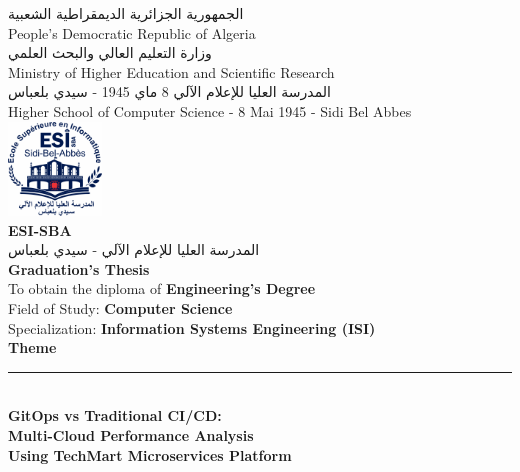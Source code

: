 \thispagestyle{empty}

\begin{center}

{\footnotesize \textarabic{الجمهورية الجزائرية الديمقراطية الشعبية}} \\[0.05cm]
{\footnotesize People's Democratic Republic of Algeria} \\[0.1cm]

{\footnotesize \textarabic{وزارة التعليم العالي والبحث العلمي}} \\[0.05cm]
{\footnotesize Ministry of Higher Education and Scientific Research} \\[0.1cm]

{\footnotesize \textarabic{المدرسة العليا للإعلام الآلي 8 ماي 1945 - سيدي بلعباس}} \\[0.05cm]
{\footnotesize Higher School of Computer Science - 8 Mai 1945 - Sidi Bel Abbes} \\[0.2cm]

\includegraphics[width=2.5cm]{figures/logos/esi-sba-logo.png} \\[0.15cm]

{\small \textbf{ESI-SBA}} \\[0.05cm]
{\footnotesize \textarabic{المدرسة العليا للإعلام الآلي - سيدي بلعباس}} \\[0.3cm]

{\large \textbf{Graduation's Thesis}} \\[0.2cm]

{\footnotesize To obtain the diploma of \textbf{Engineering's Degree}} \\[0.1cm]
{\footnotesize Field of Study: \textbf{Computer Science}} \\[0.1cm]
{\footnotesize Specialization: \textbf{Information Systems Engineering (ISI)}} \\[0.3cm]

{\normalsize \textbf{Theme}} \\[0.1cm]
\rule{13cm}{0.5pt} \\[0.2cm]

{\normalsize \textbf{GitOps vs Traditional CI/CD:}} \\[0.1cm]
{\normalsize \textbf{Multi-Cloud Performance Analysis}} \\[0.1cm]
{\normalsize \textbf{Using TechMart Microservices Platform}} \\[0.15cm]


\end{center}
